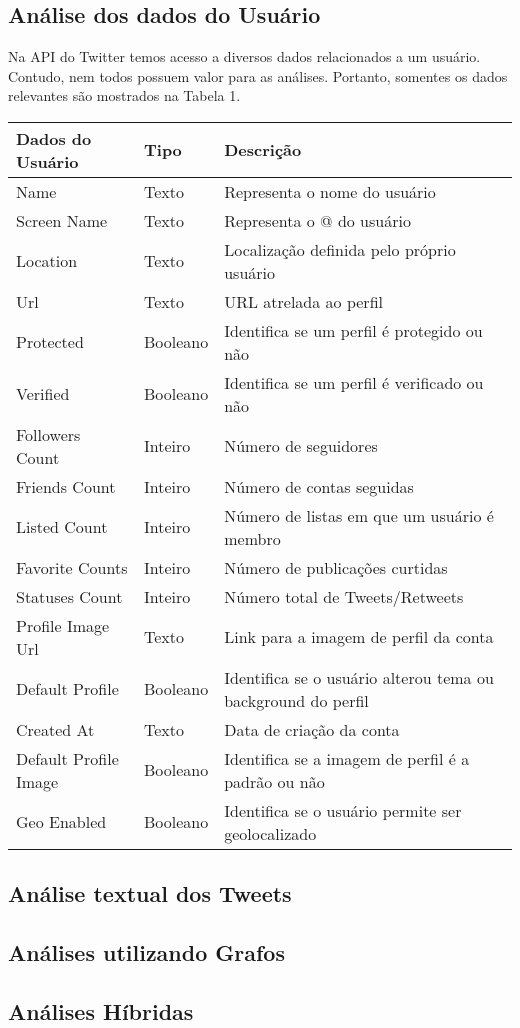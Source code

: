 \subsection{Análise dos dados do Usuário}
Na API do Twitter temos acesso a diversos dados relacionados a um usuário. Contudo, nem todos possuem valor para as análises. Portanto, somentes os dados relevantes são mostrados na Tabela 1.



\begin{table}[]
\begin{tabular}{|l|l|l|}
\hline
\textbf{Dados do Usuário}& \textbf{Tipo} & \textbf{Descrição} \\ \hline
Name & Texto &Representa o nome do usuário \\ \hline
Screen Name  & Texto  &  Representa o @ do usuário\\ \hline
Location & Texto   & Localização definida pelo próprio usuário                             \\ \hline
Url  & Texto   & URL atrelada ao perfil                            \\ \hline
Protected & Booleano & Identifica se um perfil é protegido ou não \\ \hline
Verified & Booleano& Identifica se um perfil é verificado ou não \\ \hline
Followers Count & Inteiro & Número de seguidores \\ \hline
Friends Count & Inteiro & Número de contas seguidas \\ \hline
Listed Count & Inteiro & Número de listas em que um usuário é membro \\ \hline
Favorite Counts & Inteiro & Número de publicações curtidas \\ \hline
Statuses Count & Inteiro & Número total de Tweets/Retweets \\ \hline
Profile Image Url & Texto & Link para a imagem de perfil da conta \\ \hline
Default Profile & Booleano & Identifica se o usuário alterou tema ou background do perfil\\ \hline
Created At & Texto & Data de criação da conta\\ \hline
Default Profile Image & Booleano & Identifica se a imagem de perfil é a padrão ou não \\ \hline
Geo Enabled & Booleano & Identifica se o usuário permite ser geolocalizado\\ \hline
\end{tabular}
\end{table}
\subsection{Análise textual dos Tweets}

\subsection{Análises utilizando Grafos}

\subsection{Análises Híbridas}